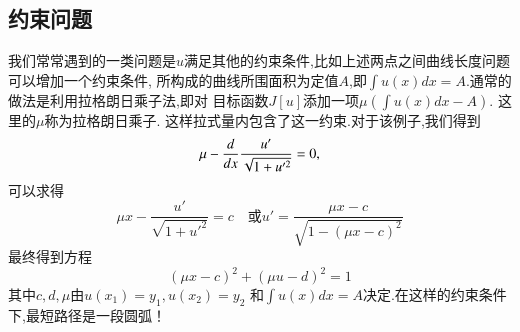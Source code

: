 \subsection{约束问题}
我们常常遇到的一类问题是$u$满足其他的约束条件,比如上述两点之间曲线长度问题可以增加一个约束条件,
所构成的曲线所围面积为定值$A$,即$\int u(x) dx = A$.通常的做法是利用拉格朗日乘子法,即对
目标函数$J[u]$添加一项$\mu\left( \int u(x) dx - A \right)$. 这里的$\mu$称为拉格朗日乘子.
这样拉式量内包含了这一约束.对于该例子,我们得到
\[
  \mu - \frac{d{}}{d{x}} \frac{u'}{\sqrt{1 + u'^2}} = 0,
\]
可以求得
\[
  \mu x-\frac{u'}{\sqrt{1+u'^2}}=c \quad \textrm{或} u'=\frac{\mu x-c}{\sqrt{1-(\mu x-c)^2}}
 \]
最终得到方程
\[
  (\mu x - c)^2 + (\mu u -d)^2 = 1
\]
其中$c,d,\mu$由$u(x_1)=y_1, u(x_2) = y_2$ 和$\int u(x) dx = A$决定.在这样的约束条件下,最短路径是一段圆弧！

